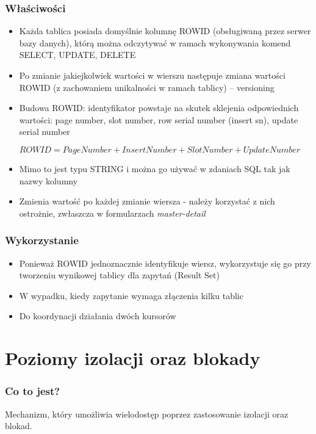 \documentclass[a4paper,twoside]{article}
\begin{document}
  \section*{Właściwości}
      \begin{itemize}
      \item Każda tablica posiada domyślnie kolumnę ROWID (obsługiwaną przez serwer bazy danych), którą można odczytywać w ramach wykonywania komend SELECT, UPDATE, DELETE
      \item Po zmianie jakiejkolwiek wartości w wierszu następuje zmiana wartości ROWID (z zachowaniem unikalności w ramach tablicy) – versioning
      \item Budowa ROWID: identyfikator powstaje na skutek sklejenia odpowiednich wartości: page number, slot number, row serial number (insert sn), update serial number
        \begin{center}
        \(ROWID = PageNumber  + InsertNumber + SlotNumber + UpdateNumber\)
        \end{center}
      \item Mimo to jest typu STRING i można go używać w zdaniach SQL tak jak nazwy kolumny
      \item Zmienia wartość po każdej zmianie wiersza - należy korzystać z nich ostrożnie, zwłaszcza w formularzach \emph{master-detail}
      \end{itemize}
  \section*{Wykorzystanie}
      \begin{itemize}
      \item Ponieważ ROWID jednoznacznie identyfikuje wiersz, wykorzystuje się go przy tworzeniu wynikowej tablicy dla zapytań (Result Set)
      \item W wypadku, kiedy zapytanie wymaga złączenia kilku tablic
      \item Do koordynacji działania dwóch kursorów
      \end{itemize}

  \part*{Poziomy izolacji oraz blokady}


  \section*{Co to jest?}
      Mechanizm, który umożliwia wielodostęp poprzez zastosowanie izolacji oraz blokad.
\end{document}
